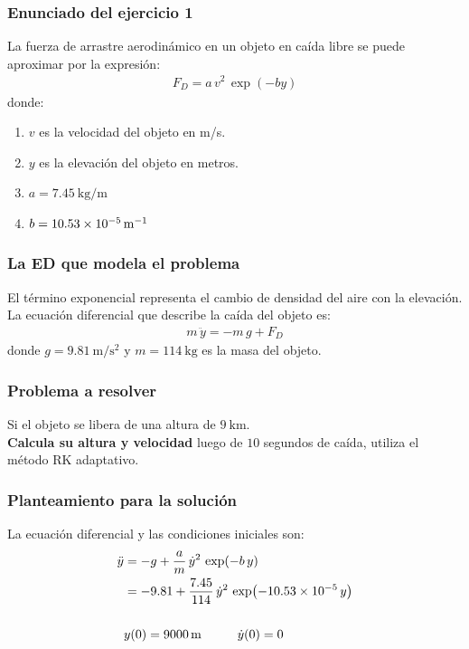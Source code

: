 \documentclass[12pt]{beamer}
\begin{document}
\begin{frame}
\frametitle{Enunciado del ejercicio 1}
La fuerza de arrastre aerodinámico en un objeto en caída libre se puede aproximar por la expresión:
\pause
\begin{align*}
F_{D} = a \, v^{2} \, \exp(-by)
\end{align*}
donde:
\pause
{}
\begin{enumerate}[<+->]
\item $v$ es la velocidad del objeto en m/s.
\item $y$ es la elevación del objeto en metros.
\item $a = \SI{7.45}{\kilo\gram\per\metre}$
\item $b = \SI{10.53d-5}{\per\metre}$
\end{enumerate}
\end{frame}
\begin{frame}
\frametitle{La ED que modela el problema}
El término exponencial representa el cambio de densidad del aire con la elevación.
\\
\bigskip
\pause
La ecuación diferencial que describe la caída del objeto es:
\pause
\begin{align*}
m \, \ddot{y} = - m \, g + F_{D}
\end{align*}
donde $g = \SI{9.81}{\meter\per\square\second}$ y $ m = \SI{114}{\kilo\gram}$ es la masa del objeto.
\end{frame}
\begin{frame}
\frametitle{Problema a resolver}
Si el objeto se libera de una altura de $\SI{9}{\kilo\meter}$.
\\
\bigskip
\pause
\textbf{\textcolor{burgundy}{Calcula su altura y velocidad}} luego de $10$ segundos de caída, utiliza el método RK adaptativo.
\end{frame}
\begin{frame}
\frametitle{Planteamiento para la solución}
La ecuación diferencial y las condiciones iniciales son:
\pause
\begin{align*}
\ddot{y} &= - g + \dfrac{a}{m} \, \dot{y}^{2} \, \exp(-b \, y) \\
&= -9.81 + \dfrac{7.45}{114} \, \dot{y}^{2} \, \exp(\num{-10.53d-5} \, y) \\
{} \\
&{} y(0) = \SI{9000}{\meter} \hspace{1cm} \dot{y}(0) = 0
\end{align*}
\end{frame}
\end{document}
